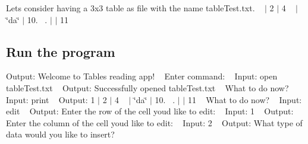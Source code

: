 \begin{DoxyItemize}
\item Let\textquotesingle{}s consider having a 3x3 table as file with the name table\+Test.\+txt. ~ $\vert$ 2 $\vert$ 4 ~ $\vert$ \char`\"{}da\char`\"{} $\vert$ 10. ~. $\vert$ $\vert$ 11 ~\newline

\end{DoxyItemize}\hypertarget{index_running}{}\subsection{Run the program}\label{index_running}
Output\+: Welcome to Table\textquotesingle{}s reading app! ~\newline
 Enter command\+: ~\newline
 Input\+: open table\+Test.\+txt ~\newline
 Output\+: Successfully opened table\+Test.\+txt ~\newline
 What to do now? ~\newline
 Input\+: print ~\newline
 Output\+: 1 $\vert$ 2 $\vert$ 4 ~ $\vert$ \char`\"{}da\char`\"{} $\vert$ 10. ~. $\vert$ $\vert$ 11 ~\newline
 What to do now? ~\newline
 Input\+: edit ~\newline
 Output\+: Enter the row of the cell you\textquotesingle{}d like to edit\+: ~\newline
 Input\+: 1 ~\newline
 Output\+: Enter the column of the cell you\textquotesingle{}d like to edit\+: ~\newline
 Input\+: 2 ~\newline
 Output\+: What type of data would you like to insert?~\newline

